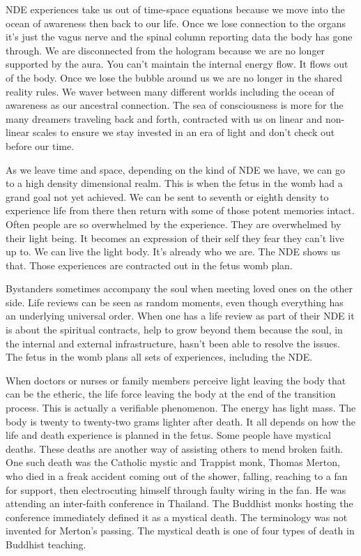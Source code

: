 \documentclass[letterpaper,9pt,twoside,titlepage,onecolumn,openany]{book}
\begin{document}
NDE experiences take us out of time-space equations because we move into
the ocean of awareness then back to our life. Once we lose connection to
the organs it's just the vagus nerve and the spinal column reporting
data the body has gone through. We are disconnected from the hologram
because we are no longer supported by the aura. You can't maintain the
internal energy flow. It flows out of the body. Once we lose the bubble
around us we are no longer in the shared reality rules. We waver between
many different worlds including the ocean of awareness as our ancestral
connection. The sea of consciousness is more for the many dreamers
traveling back and forth, contracted with us on linear and non-linear
scales to ensure we stay invested in an era of light and don't check out
before our time.

As we leave time and space, depending on the kind of NDE we have, we can
go to a high density dimensional realm. This is when the fetus in the
womb had a grand goal not yet achieved. We can be sent to seventh or
eighth density to experience life from there then return with some of
those potent memories intact. Often people are so overwhelmed by the
experience. They are overwhelmed by their light being. It becomes an
expression of their self they fear they can't live up to. We can live
the light body. It's already who we are. The NDE shows us that. Those
experiences are contracted out in the fetus womb plan.

Bystanders sometimes accompany the soul when meeting loved ones on the
other side. Life reviews can be seen as random moments, even though
everything has an underlying universal order. When one has a life review
as part of their NDE it is about the spiritual contracts, help to grow
beyond them because the soul, in the internal and external
infrastructure, hasn't been able to resolve the issues. The fetus in the
womb plans all sets of experiences, including the NDE.

When doctors or nurses or family members perceive light leaving the body
that can be the etheric, the life force leaving the body at the end of
the transition process. This is actually a verifiable phenomenon. The
energy has light mass. The body is twenty to twenty-two grams lighter
after death. It all depends on how the life and death experience is
planned in the fetus. Some people have mystical deaths. These deaths are
another way of assisting others to mend broken faith. One such death was
the Catholic mystic and Trappist monk, Thomas Merton, who died in a
freak accident coming out of the shower, falling, reaching to a fan for
support, then electrocuting himself through faulty wiring in the fan. He
was attending an inter-faith conference in Thailand. The Buddhist monks
hosting the conference immediately defined it as a mystical death. The
terminology was not invented for Merton's passing. The mystical death is
one of four types of death in Buddhist teaching.
\end{document}

